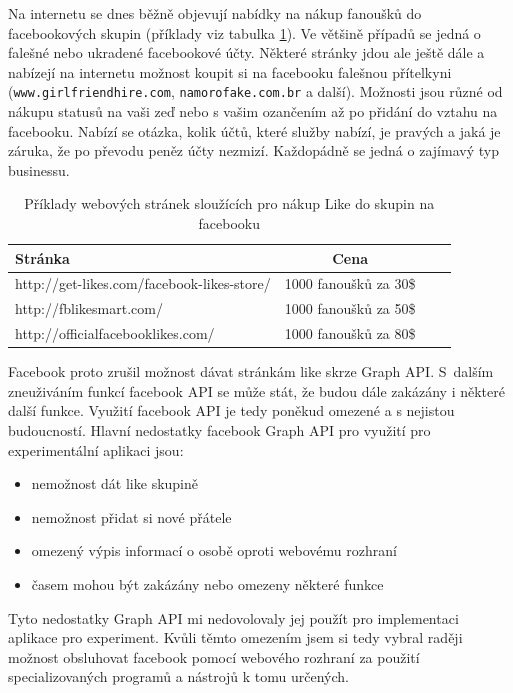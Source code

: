 \documentclass[thesis=M,czech]{FITthesis}[2013/05/10]
\begin{document}
Na internetu se dnes běžně objevují nabídky na nákup fanoušků do facebookových skupin (příklady viz tabulka \ref{tab:likes-buy}). Ve většině případů se jedná o falešné nebo ukradené facebookové účty. Některé stránky jdou ale ještě dále a nabízejí na internetu možnost koupit si na facebooku falešnou přítelkyni (\verb|www.girlfriendhire.com|, \verb|namorofake.com.br| a další). Možnosti jsou různé od nákupu statusů na vaši zeď nebo s vašim ozančením až po přidání do vztahu na facebooku. Nabízí se otázka, kolik účtů, které služby nabízí, je pravých a jaká je záruka, že po převodu peněz účty nezmizí. Každopádně se jedná o zajímavý typ businessu.


\begin{table}[h]
\centering
\caption{Příklady webových stránek sloužících pro nákup Like do skupin na facebooku}\label{tab:likes-buy}
\begin{tabular}{| l | c | p{5cm} | c |}
	\hline
	\textbf{Stránka} & 
	\textbf{Cena} \\ \hline
	
	http://get-likes.com/facebook-likes-store/ &
	1000 fanoušků za 30\$ \\ \hline
	
	http://fblikesmart.com/ &
	1000 fanoušků za 50\$ \\ \hline
	
	http://officialfacebooklikes.com/ &
	1000 fanoušků za 80\$ \\ \hline
\end{tabular}
\end{table}


Facebook proto zrušil možnost dávat stránkám like skrze Graph API. S~dalším zneuživáním funkcí facebook API se může stát, že budou dále zakázány i některé další funkce. Využití facebook API je tedy poněkud omezené a s nejistou budoucností. Hlavní nedostatky facebook Graph API pro využití pro experimentální aplikaci jsou:

\begin{itemize}
  \item nemožnost dát like skupině
  \item nemožnost přidat si nové přátele
  \item omezený výpis informací o osobě oproti webovému rozhraní
  \item časem mohou být zakázány nebo omezeny některé funkce
\end{itemize}

Tyto nedostatky Graph API mi nedovolovaly jej použít pro implementaci  aplikace pro experiment. Kvůli těmto omezením jsem si tedy vybral raději možnost obsluhovat facebook pomocí webového rozhraní za použití specializovaných programů a nástrojů k tomu určených.
\end{document}
